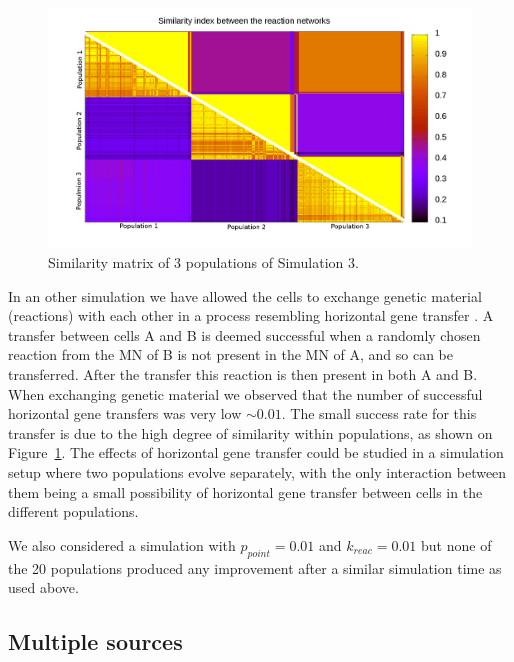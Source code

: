 \documentclass[a4paper,12pt]{article}
\begin{document}
\begin{figure}[htpb]
	\centering
	\includegraphics[width=1\linewidth]{simmatrix_sim3.png}
	\caption{Similarity matrix of 3 populations of Simulation 3.}
	\label{fig:simmatrix_sim3}
\end{figure}


In an other simulation we have allowed the cells to exchange genetic material (reactions) with each other in a process resembling horizontal gene transfer \cite{horizontalgenetransfer}. A transfer between cells A and B is deemed successful when a randomly chosen reaction from the MN of B is not present in the MN of A, and so can be transferred. After the transfer this reaction is then present in both A and B. When exchanging genetic material we observed that the number of successful horizontal gene transfers was very low $\sim 0.01$. The small success rate for this transfer is due to the high degree of similarity within populations, as shown on Figure~\ref{fig:simmatrix_sim3}. The effects of horizontal gene transfer could be studied in a simulation setup where two populations evolve separately, with the only interaction between them being a small possibility of horizontal gene transfer between cells in the different populations. %

We also considered a simulation with $p_{point}=0.01$ and $k_{reac}=0.01$ but none of the 20 populations produced any improvement after a similar simulation time as used above. 




\subsection{Multiple sources}
\label{sub:multiple_sources_and_sinks}
\end{document}
